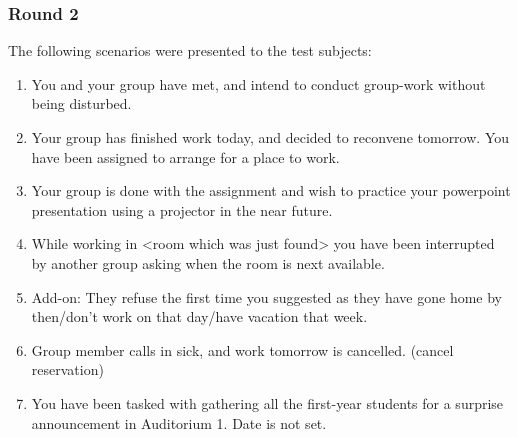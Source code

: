 \begin{enumerate}
{\subsubsection{Round 2}
The following scenarios were presented to the test subjects:
\begin{enumerate}
\item You and your group have met, and intend to conduct group-work without being disturbed.
\item Your group has finished work today, and decided to reconvene tomorrow. You have been assigned to arrange for a place to work.
\item Your group is done with the assignment and wish to practice your powerpoint presentation using a projector in the near future.
\item While working in <room which was just found> you have been interrupted by another group asking when the room is next available.
\item Add-on: They refuse the first time you suggested as they have gone home by then/don't work on that day/have vacation that week.
\item Group member calls in sick, and work tomorrow is cancelled. (cancel reservation)
\item You have been tasked with gathering all the first-year students for a surprise announcement in Auditorium 1. Date is not set.
\end{enumerate}

}
\end{enumerate}

